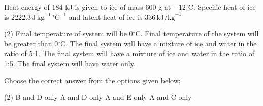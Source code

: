 \item Heat energy of 184 kJ is given to ice of mass 600 g at $-12^\circ$C. Specific heat of ice is $2222.3 \, \text{J} \, \text{kg}^{-1} \, ^\circ\text{C}^{-1}$ and latent heat of ice is $336 \, \text{kJ/kg}^{-1}$
    \begin{tasks}(2)
        \task Final temperature of system will be 0$^\circ$C.
        \task Final temperature of the system will be greater than 0$^\circ$C.
        \task The final system will have a mixture of ice and water in the ratio of 5:1.
        \task The final system will have a mixture of ice and water in the ratio of 1:5.
        \task The final system will have water only.
    \end{tasks}
Choose the correct answer from the options given below:
    \begin{tasks}(2)
        \task B and D only
        \task A and D only
        \task A and E only
        \task A and C only
    \end{tasks}
